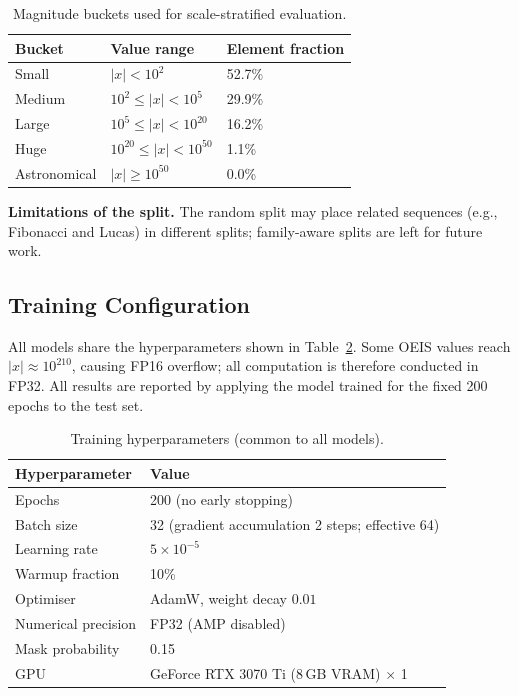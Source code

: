\begin{table}[htbp]
\caption{Magnitude buckets used for scale-stratified evaluation.}
\label{tab:buckets}
\centering
\begin{tabular}{lll}
\hline
Bucket       & Value range                     & Element fraction \\
\hline
Small        & $|x| < 10^2$                    & 52.7\%           \\
Medium       & $10^2 \leq |x| < 10^5$          & 29.9\%           \\
Large        & $10^5 \leq |x| < 10^{20}$       & 16.2\%           \\
Huge         & $10^{20} \leq |x| < 10^{50}$    &  1.1\%           \\
Astronomical & $|x| \geq 10^{50}$              &  0.0\%           \\
\hline
\end{tabular}
\end{table}

\textbf{Limitations of the split.} The random split may place related sequences (e.g.,
Fibonacci and Lucas) in different splits; family-aware splits are left for future work.

\subsection{Training Configuration}
\label{sec:training-config}

All models share the hyperparameters shown in Table~\ref{tab:hyperparams}.
Some OEIS values reach $|x| \approx 10^{210}$, causing FP16 overflow; all computation is
therefore conducted in FP32. All results are reported by applying the model trained for the
fixed 200 epochs to the test set.

\begin{table}[htbp]
\caption{Training hyperparameters (common to all models).}
\label{tab:hyperparams}
\centering
\begin{tabular}{ll}
\hline
Hyperparameter        & Value \\
\hline
Epochs                & 200 (no early stopping) \\
Batch size            & 32 (gradient accumulation 2 steps; effective 64) \\
Learning rate         & $5 \times 10^{-5}$ \\
Warmup fraction       & 10\% \\
Optimiser             & AdamW, weight decay $0.01$ \\
Numerical precision   & FP32 (AMP disabled) \\
Mask probability      & 0.15 \\
GPU                   & GeForce RTX 3070 Ti (8\,GB VRAM) $\times$ 1 \\
\hline
\end{tabular}
\end{table}


